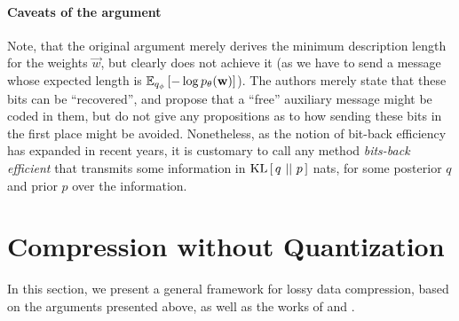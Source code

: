 \paragraph{Caveats of the argument}
Note, that the original argument merely derives the minimum description length
for the weights $\vec{w}$, but clearly does not achieve it (as we have to send a
message whose expected length is $\Exp{-\log p_\theta(\vec{w})}{q_\phi}$). The
authors merely state that these bits can be ``recovered'', and propose that a
``free'' auxiliary message might be coded in them, but do not give any
propositions as to how sending these bits in the first place might be avoided.
Nonetheless, as the notion of bit-back efficiency has expanded in recent years,
it is customary to call any method \textit{bits-back efficient} that transmits 
some information in $\KL{q}{p}$ nats, for some posterior $q$ and prior $p$ over 
the information.

\section{Compression without Quantization}
\label{sec:compression_without_quantization}
\par
In this section, we present a general framework for lossy data compression, based on
the arguments presented above, as well as the works of
\cite{harsha2007communication} and \cite{havasi2018minimal}. 


